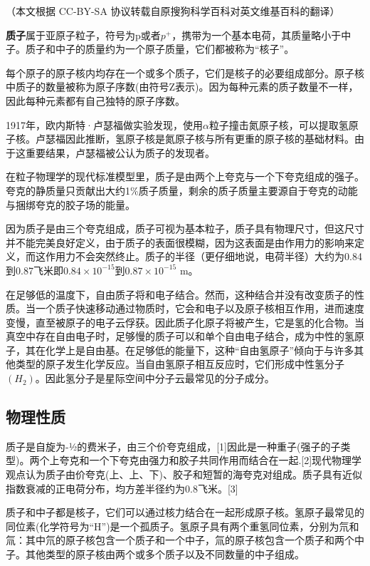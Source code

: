 
（本文根据 CC-BY-SA 协议转载自原搜狗科学百科对英文维基百科的翻译）

\textbf{质子}属于亚原子粒子，符号为p或者$p^+$，携带为一个基本电荷，其质量略小于中子。质子和中子的质量约为一个原子质量，它们都被称为“核子”。

每个原子的原子核内均存在一个或多个质子，它们是核子的必要组成部分。原子核中质子的数量被称为原子序数(由符号Z表示)。因为每种元素的质子数量不一样，因此每种元素都有自己独特的原子序数。

1917年，欧内斯特·卢瑟福做实验发现，使用$\alpha$粒子撞击氮原子核，可以提取氢原子核。卢瑟福因此推断，氢原子核是氮原子核与所有更重的原子核的基础材料。由于这重要结果，卢瑟福被公认为质子的发现者。

在粒子物理学的现代标准模型里，质子是由两个上夸克与一个下夸克组成的强子。夸克的静质量只贡献出大约1\%质子质量，剩余的质子质量主要源自于夸克的动能与捆绑夸克的胶子场的能量。

因为质子是由三个夸克组成，质子可视为基本粒子，质子具有物理尺寸，但这尺寸并不能完美良好定义，由于质子的表面很模糊，因为这表面是由作用力的影响来定义，而这作用力不会突然终止。质子的半径（更仔细地说，电荷半径）大约为0.84到0.87飞米即$0.84\times10^{-15}$到$0.87\times10^{-15}$ m。

在足够低的温度下，自由质子将和电子结合。然而，这种结合并没有改变质子的性质。当一个质子快速移动通过物质时，它会和电子以及原子核相互作用，进而速度变慢，直至被原子的电子云俘获。因此质子化原子将被产生，它是氢的化合物。当真空中存在自由电子时，足够慢的质子可以和单个自由电子结合，成为中性的氢原子，其在化学上是自由基。在足够低的能量下，这种“自由氢原子”倾向于与许多其他类型的原子发生化学反应。当自由氢原子相互反应时，它们形成中性氢分子$(H_2)$。因此氢分子是星际空间中分子云最常见的分子成分。

\subsection{物理性质}
质子是自旋为-½的费米子，由三个价夸克组成，[1]因此是一种重子(强子的子类型)。两个上夸克和一个下夸克由强力和胶子共同作用而结合在一起.[2]现代物理学观点认为质子由价夸克(上、上、下)、胶子和短暂的海夸克对组成。质子具有近似指数衰减的正电荷分布，均方差半径约为0.8飞米。[3]

质子和中子都是核子，它们可以通过核力结合在一起形成原子核。氢原子最常见的同位素(化学符号为“H”)是一个孤质子。氢原子具有两个重氢同位素，分别为氘和氚：其中氘的原子核包含一个质子和一个中子，氚的原子核包含一个质子和两个中子。其他类型的原子核由两个或多个质子以及不同数量的中子组成。

